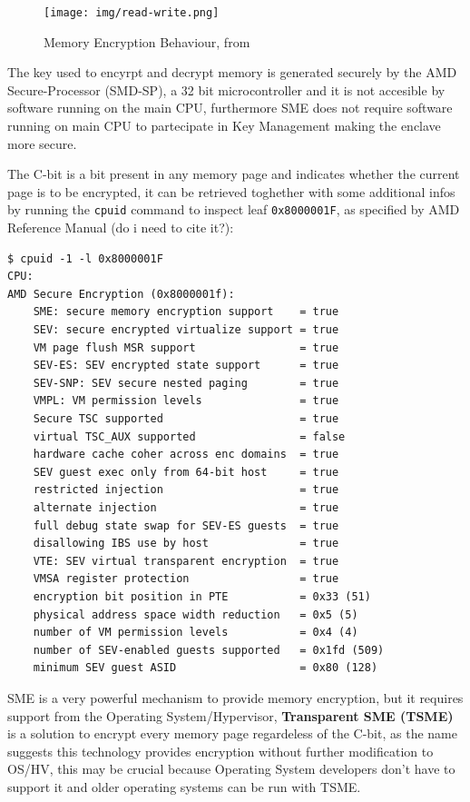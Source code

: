 \documentclass[twocolumn]{article}
\begin{document}
    \begin{figure}
        \centering
        \texttt{[image: img/read-write.png]}
        \caption{Memory Encryption Behaviour, from \cite{memory-encryption}}
    \end{figure}

    The key used to encyrpt and decrypt memory is generated securely by the AMD Secure-Processor (SMD-SP), a 32 bit microcontroller and it is not accesible by software running on the main CPU, furthermore SME does not require software running on main CPU to partecipate in Key Management making the enclave more secure.

    The C-bit is a bit present in any memory page and indicates whether the current page is to be encrypted, it can be retrieved toghether with some additional infos by running the \texttt{cpuid} command to inspect leaf \texttt{0x8000001F}, as specified by AMD Reference Manual (do i need to cite it?):

    \begin{verbatim}
$ cpuid -1 -l 0x8000001F
CPU:
AMD Secure Encryption (0x8000001f):
    SME: secure memory encryption support    = true
    SEV: secure encrypted virtualize support = true
    VM page flush MSR support                = true
    SEV-ES: SEV encrypted state support      = true
    SEV-SNP: SEV secure nested paging        = true
    VMPL: VM permission levels               = true
    Secure TSC supported                     = true
    virtual TSC_AUX supported                = false
    hardware cache coher across enc domains  = true
    SEV guest exec only from 64-bit host     = true
    restricted injection                     = true
    alternate injection                      = true
    full debug state swap for SEV-ES guests  = true
    disallowing IBS use by host              = true
    VTE: SEV virtual transparent encryption  = true
    VMSA register protection                 = true
    encryption bit position in PTE           = 0x33 (51)
    physical address space width reduction   = 0x5 (5)    
    number of VM permission levels           = 0x4 (4)
    number of SEV-enabled guests supported   = 0x1fd (509)
    minimum SEV guest ASID                   = 0x80 (128)
    \end{verbatim}
    
    SME is a very powerful mechanism to provide memory encryption, but it requires support from the Operating System/Hypervisor, \textbf{Transparent SME (TSME)} is a solution to encrypt every memory page regardeless of the C-bit, as the name suggests this technology provides encryption without further modification to OS/HV, this may be crucial because Operating System developers don't have to support it and older operating systems can be run with TSME.
\end{document}
